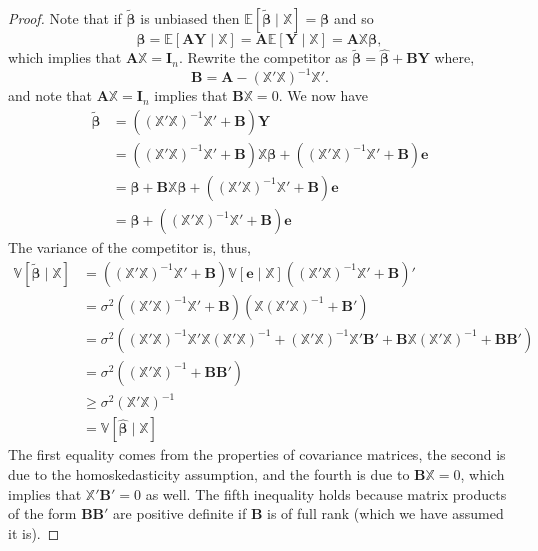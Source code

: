 \documentclass[
  13pt,
  letterpaper,
  DIV=11,
  numbers=noendperiod]{scrreprt}
\newcommand{\mb}{\symbf}
\newcommand{\E}{\mathbb{E}}
\newcommand{\V}{\mathbb{V}}
\newcommand{\Xmat}{\mathbb{X}}
\newcommand{\bfbeta}{\mb{\beta}}
\newcommand{\bhat}{\widehat{\mb{\beta}}}
\theoremstyle{plain}
\theoremstyle{definition}
\theoremstyle{definition}
\theoremstyle{remark}
\begin{document}
\begin{proof}
Note that if \(\widetilde{\bfbeta}\) is unbiased then
\(\E[\widetilde{\bfbeta} \mid \Xmat] = \bfbeta\) and so \[
\bfbeta = \E[\mb{AY} \mid \Xmat] = \mb{A}\E[\mb{Y} \mid \Xmat] = \mb{A}\Xmat\bfbeta,
\] which implies that \(\mb{A}\Xmat = \mb{I}_n\). Rewrite the competitor
as \(\widetilde{\bfbeta} = \bhat + \mb{BY}\) where, \[ 
\mb{B} = \mb{A} - \left(\Xmat'\Xmat\right)^{-1}\Xmat'.
\] and note that \(\mb{A}\Xmat = \mb{I}_n\) implies that
\(\mb{B}\Xmat = 0\). We now have \[ 
\begin{aligned}
  \widetilde{\bfbeta} &= \left( \left(\Xmat'\Xmat\right)^{-1}\Xmat' + \mb{B}\right)\mb{Y} \\
                      &= \left( \left(\Xmat'\Xmat\right)^{-1}\Xmat' + \mb{B}\right)\Xmat\bfbeta + \left( \left(\Xmat'\Xmat\right)^{-1}\Xmat' + \mb{B}\right)\mb{e} \\
                      &= \bfbeta + \mb{B}\Xmat\bfbeta + \left( \left(\Xmat'\Xmat\right)^{-1}\Xmat' + \mb{B}\right)\mb{e} \\
  &= \bfbeta + \left( \left(\Xmat'\Xmat\right)^{-1}\Xmat' + \mb{B}\right)\mb{e}
\end{aligned}
\] The variance of the competitor is, thus, \[ 
\begin{aligned}
  \V[\widetilde{\bfbeta} \mid \Xmat]
  &= \left( \left(\Xmat'\Xmat\right)^{-1}\Xmat' + \mb{B}\right)\V[\mb{e}\mid \Xmat]\left( \left(\Xmat'\Xmat\right)^{-1}\Xmat' + \mb{B}\right)' \\
  &= \sigma^{2}\left( \left(\Xmat'\Xmat\right)^{-1}\Xmat' + \mb{B}\right)\left( \Xmat\left(\Xmat'\Xmat\right)^{-1} + \mb{B}'\right) \\
  &= \sigma^{2}\left(\left(\Xmat'\Xmat\right)^{-1}\Xmat'\Xmat\left(\Xmat'\Xmat\right)^{-1} + \left(\Xmat'\Xmat\right)^{-1}\Xmat'\mb{B}' + \mb{B}\Xmat\left(\Xmat'\Xmat\right)^{-1} + \mb{BB}'\right)\\
  &= \sigma^{2}\left(\left(\Xmat'\Xmat\right)^{-1} + \mb{BB}'\right)\\
  &\geq \sigma^{2}\left(\Xmat'\Xmat\right)^{-1} \\
  &= \V[\bhat \mid \Xmat]
\end{aligned}
\] The first equality comes from the properties of covariance matrices,
the second is due to the homoskedasticity assumption, and the fourth is
due to \(\mb{B}\Xmat = 0\), which implies that \(\Xmat'\mb{B}' = 0\) as
well. The fifth inequality holds because matrix products of the form
\(\mb{BB}'\) are positive definite if \(\mb{B}\) is of full rank (which
we have assumed it is).
\end{proof}
\end{document}
